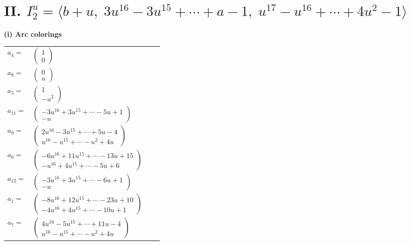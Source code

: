 \documentclass[1p]{elsarticle_modified}
\theoremstyle{definition}
\begin{document}
\centering \section*{II. $I^u_{2}= \langle b+u,\;3 u^{16}-3 u^{15}+\cdots+a-1,\;u^{17}- u^{16}+\cdots+4 u^2-1 \rangle$}
\flushleft \textbf{(i) Arc colorings}\\
\begin{tabular}{m{7pt} m{180pt} m{7pt} m{180pt} }
\flushright $a_{4}=$&$\begin{pmatrix}1\\0\end{pmatrix}$ \\
\flushright $a_{8}=$&$\begin{pmatrix}0\\u\end{pmatrix}$ \\
\flushright $a_{5}=$&$\begin{pmatrix}1\\- u^2\end{pmatrix}$ \\
\flushright $a_{11}=$&$\begin{pmatrix}-3 u^{16}+3 u^{15}+\cdots-5 u+1\\- u\end{pmatrix}$ \\
\flushright $a_{9}=$&$\begin{pmatrix}2 u^{16}-3 u^{15}+\cdots+5 u-4\\u^{16}- u^{15}+\cdots- u^2+4 u\end{pmatrix}$ \\
\flushright $a_{6}=$&$\begin{pmatrix}-6 u^{16}+11 u^{15}+\cdots-13 u+15\\- u^{16}+4 u^{15}+\cdots-5 u+6\end{pmatrix}$ \\
\flushright $a_{12}=$&$\begin{pmatrix}-3 u^{16}+3 u^{15}+\cdots-6 u+1\\- u\end{pmatrix}$ \\
\flushright $a_{1}=$&$\begin{pmatrix}-8 u^{16}+12 u^{15}+\cdots-23 u+10\\-4 u^{16}+4 u^{15}+\cdots-10 u+1\end{pmatrix}$ \\
\flushright $a_{7}=$&$\begin{pmatrix}4 u^{16}-5 u^{15}+\cdots+11 u-4\\u^{16}- u^{15}+\cdots- u^2+4 u\end{pmatrix}$ \\

\end{tabular}
\end{document}
